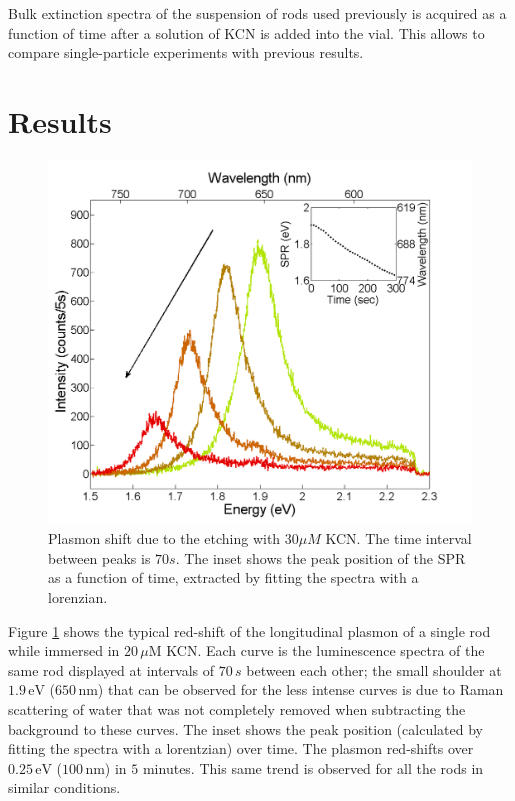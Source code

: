 \documentclass{article}
\begin{document}
Bulk extinction spectra of the suspension of rods used previously is acquired as
a function of time after a solution of KCN is added into the vial. This allows
to compare single-particle experiments with previous results. 

\section{Results}

\begin{figure}[p]
 \centering
 \includegraphics[width=0.95\linewidth]{plasmon_single_rod.png}
 \caption{Plasmon shift due to the etching with $30\mu M$ KCN. The time
 interval between peaks is $70s$. The inset shows the peak position of the SPR as a
 function of time, extracted by fitting the spectra with a lorenzian.}
 \label{fig:plasmon_single_rod}
\end{figure}

Figure \ref{fig:plasmon_single_rod} shows the typical red-shift of the
longitudinal plasmon of a single rod while immersed in $20\,\mu\textrm{M}$ KCN.
Each curve is the luminescence spectra of the same rod displayed at intervals of
$70\,s$ between each other; the small shoulder at $1.9\,\textrm{eV}$
($650\,\textrm{nm}$) that can be observed for the less intense curves is due to
Raman scattering of water that was not completely removed when subtracting the
background to these curves. The inset shows the peak position (calculated by
fitting the spectra with a lorentzian) over time. The plasmon red-shifts over
$0.25\,\textrm{eV}$ ($100\,\textrm{nm}$) in $5$ minutes. This same trend is
observed for all the rods in similar conditions.
\end{document}
